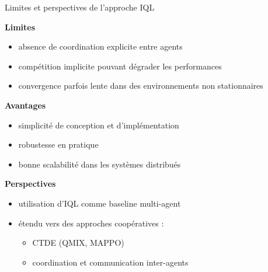 \documentclass[aspectratio=169]{beamer}
\begin{document}
\begin{frame}{Limites et perspectives de l’approche IQL}

\textbf{Limites}

\begin{itemize}
  \item absence de coordination explicite entre agents
  \item compétition implicite pouvant dégrader les performances
  \item convergence parfois lente dans des environnements non stationnaires
\end{itemize}

\bigskip

\textbf{Avantages}

\begin{itemize}
  \item simplicité de conception et d’implémentation
  \item robustesse en pratique
  \item bonne scalabilité dans les systèmes distribués
\end{itemize}

\bigskip

\textbf{Perspectives}

\begin{itemize}
  \item utilisation d’IQL comme baseline multi-agent
  \item étendu vers des approches coopératives :
  \begin{itemize}
    \item CTDE (QMIX, MAPPO)
    \item coordination et communication inter-agents
  \end{itemize}
\end{itemize}

\end{frame}
\end{document}
